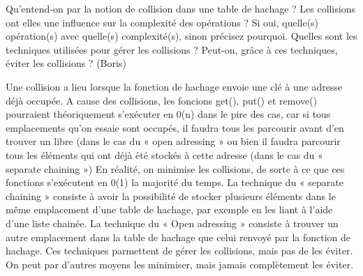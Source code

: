Qu’entend-on par la notion de collision dans une table de hachage ? Les collisions ont elles une influence sur la complexité des opérations ? Si oui, quelle(s) opération(s) avec quelle(s) complexité(s), sinon précisez pourquoi. Quelles sont les techniques utilisées pour gérer les collisions ? Peut-on, grâce à ces techniques, éviter les collisions ? (Boris)

Une collision a lieu lorsque la fonction de hachage envoie une clé à une adresse déjà occupée. A cause des collisions, les foncions get(), put() et remove() pourraient théoriquement s’exécuter en 0(n) dans le pire des cas, car si tous emplacements qu’on essaie sont occupés, il faudra tous les parcourir avant d’en trouver un libre (dans le cas du « open adressing » ou bien il faudra parcourir tous les éléments qui ont déjà été stockés à cette adresse (dans le cas du « separate chaining ») En réalité, on minimise les collisions, de sorte à ce que ces fonctions s’exécutent en 0(1) la majorité du temps. La technique du « separate chaining » consiste à avoir la possibilité de stocker plusieurs éléments dans le même emplacement d’une table de hachage, par exemple en les liant à l’aide d’une liste chainée. La technique du « Open adressing » consiste à trouver un autre emplacement dans la table de hachage que celui renvoyé par la fonction de hachage. Ces techniques parmettent de gérer les collisions, mais pas de les éviter. On peut par d’autres moyens les minimiser, mais jamais complètement les éviter.